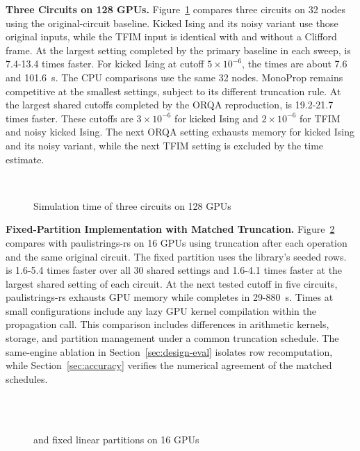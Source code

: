 \noindent\textbf{Three Circuits on 128 GPUs.}
Figure~\ref{fig:circuits128} compares three circuits on 32 nodes using the original-circuit \cuPP baseline.
Kicked Ising and its noisy variant use those original inputs, while the TFIM input is identical with and without a Clifford frame.
At the largest setting completed by the primary baseline in each sweep, \SectorQ is 7.4-13.4 times faster.
For kicked Ising at cutoff $5\times10^{-6}$, the times are about 7.6 and 101.6~s.
The CPU comparisons use the same 32 nodes.
MonoProp remains competitive at the smallest settings, subject to its different truncation rule.
At the largest shared cutoffs completed by the ORQA reproduction, \SectorQ is 19.2-21.7 times faster.
These cutoffs are $3\times10^{-6}$ for kicked Ising and $2\times10^{-6}$ for TFIM and noisy kicked Ising.
The next ORQA setting exhausts memory for kicked Ising and its noisy variant, while the next TFIM setting is excluded by the time estimate.

\begin{figure}[t]
\centering
{}\\[-2pt]
\hfill
{}\hfill
{}
\caption{Simulation time of three circuits on 128 GPUs}
\label{fig:circuits128}
\end{figure}

\noindent\textbf{Fixed-Partition Implementation with Matched Truncation.}
Figure~\ref{fig:prs} compares \SectorQ with paulistrings-rs on 16 GPUs using truncation after each operation and the same original circuit.
The fixed partition uses the library's seeded rows.
\SectorQ is 1.6-5.4 times faster over all 30 shared settings and 1.6-4.1 times faster at the largest shared setting of each circuit.
At the next tested cutoff in five circuits, paulistrings-rs exhausts GPU memory while \SectorQ completes in 29-880~s.
Times at small configurations include any lazy GPU kernel compilation within the propagation call.
This comparison includes differences in arithmetic kernels, storage, and partition management under a common truncation schedule.
The same-engine ablation in Section~\ref{sec:design-eval} isolates row recomputation, while Section~\ref{sec:accuracy} verifies the numerical agreement of the matched schedules.

\begin{figure}[t]
\centering
{}\\[-2pt]
\hfill
{}\hfill
{}\hfill
{}\\
\hfill
{}\hfill
{}
\caption{\SectorQ and fixed linear partitions on 16 GPUs}
\label{fig:prs}
\end{figure}

